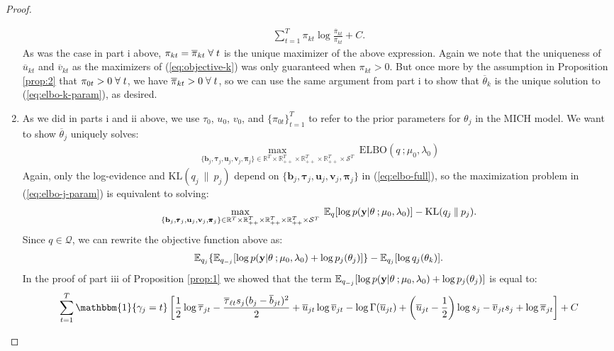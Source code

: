 \begin{proof}
\begin{enumerate}[label=\roman*.]
\begin{align*}
    \sum_{t=1}^T \pi_{kt} \log \frac{\overline{\pi}_{kt}}{\pi_{kt}} +C.
\end{align*}
As was the case in part i above, $\pi_{kt} = \overline{\pi}_{kt} \;\forall\; t$ is the unique maximizer of the above expression. Again we note that the uniqueness of $\overline{u}_{kt}$ and $\overline{v}_{kt}$ as the maximizers of (\ref{eq:objective-k}) was only guaranteed when $\pi_{kt} > 0$. But once more by the assumption in Proposition \ref{prop:2} that $\pi_{0t} >0 \;\forall\; t$, we have $\overline{\pi}_{kt} > 0 \;\forall\; t$, so we can use the same argument from part i to show that $\overline{\theta}_k$ is the unique solution to (\ref{eq:elbo-k-param}), as desired.

\item As we did in parts i and ii above, we use $\tau_0$, $u_0$, $v_0$, and $\{\pi_{0t}\}_{t=1}^T$ to refer to the prior parameters for $\theta_j$ in the MICH model. We want to show $\overline{\theta}_j$ uniquely solves: 
\begin{align}
     \max_{\{\mathbf{b}_j, \pmb{\tau}_j, \mathbf{u}_j, \mathbf{v}_j, \pmb{\pi}_j\} \in \mathbb{R}^T\times\mathbb{R}_{++}^T\times\mathbb{R}_{++}^T\times\mathbb{R}_{++}^T \times\mathcal{S}^T} \;  \text{ELBO}(q\:;\mu_0,\lambda_0) \label{eq:elbo-j-param}
\end{align}
Again, only the log-evidence and $\text{KL}(q_j\:\lVert\: p_j)$ depend on $\{\mathbf{b}_j, \pmb{\tau}_j, \mathbf{u}_j, \mathbf{v}_j, \pmb{\pi}_j\}$ in (\ref{eq:elbo-full}), so the maximization problem in (\ref{eq:elbo-j-param}) is equivalent to solving: 
\begin{align*}
     \max_{\{\mathbf{b}_j, \pmb{\tau}_j, \mathbf{u}_j, \mathbf{v}_j, \pmb{\pi}_j\} \in \mathbb{R}^T\times\mathbb{R}_{++}^T\times\mathbb{R}_{++}^T\times\mathbb{R}_{++}^T \times\mathcal{S}^T} \;  \mathbb{E}_q[\log p(\mathbf{y}| \theta\:; \mu_0,\lambda_0)] - \text{KL}(q_j\:\lVert\: p_j).
\end{align*}
Since $q \in \mathcal{Q}$, we can rewrite the objective function above as:
\begin{align*}
    \mathbb{E}_{q_j}\{\mathbb{E}_{q_{-j}}[\log p(\mathbf{y}| \theta\:; \mu_0,\lambda_0)+\log p_j(\theta_j)]\} - \mathbb{E}_{q_j}[\log q_j(\theta_k)].
\end{align*}
In the proof of part iii of Proposition \ref{prop:1} we showed that the term $\mathbb{E}_{q_{-j}}[\log p(\mathbf{y}| \theta\:; \mu_0,\lambda_0)+\log p_j(\theta_j)]$ is equal to:
\small
\begin{align*}
     \sum_{t=1}^T \mathbbm{1}\{\gamma_j = t\}\left[ \frac{1}{2} \log \overline{\tau}_{j t} - \frac{\overline{\tau}_{\ell t}s_j(b_j - \overline{b}_{jt})^2}{2} + \overline{u}_{jt} \log \overline{v}_{jt} -  \log\Gamma(\overline{u}_{jt}) + \left(\overline{u}_{jt} -\frac{1}{2}\right)\log s_j  - \overline{v}_{jt} s_j + \log \overline{\pi}_{jt}\right] + C

\end{align*}
\end{enumerate}
\end{proof}
